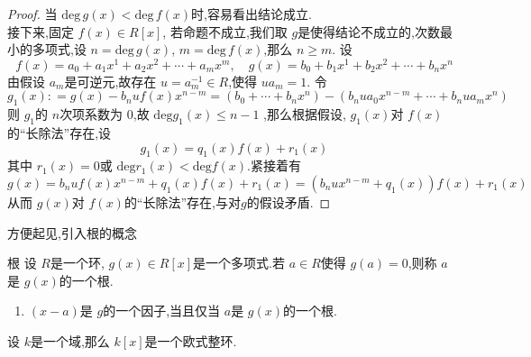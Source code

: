 \documentclass[lang=cn,12pt,color=green,fontset=none,pad]{elegantbook}
\begin{document}
\begin{proof}
    当 $ \mathrm{deg}\,g\left( x \right)< \mathrm{deg}\,f\left( x \right)   $时,容易看出结论成立.\\ 
   接下来,固定 $ f\left( x \right) \in  R[x]  $, 若命题不成立,我们取 $ g $是使得结论不成立的,次数最小的多项式,设 $   n  =  \mathrm{deg}\,g\left( x \right) $, $ m = \mathrm{deg}\,f\left( x \right)  $,那么 $ n \ge m $.
   设 $$
   f\left( x \right) = a_0+a_1x^1+a_2x^2+\cdots+a_mx^m,\quad g\left( x \right)= b_0+b_1x^1+b_2x^2+\cdots+b_nx^n  
   $$由假设 $ a_{m} $是可逆元,故存在 $ u= a_{m}^{-1}  \in  R $,使得 $ u a_{m}= 1 $. 令 $$
   g_{1}\left( x \right): = g\left( x \right) - b_{n}uf\left( x \right) x^{n-m}= \left( b_0+ \cdots + b_{n}x^{n} \right)    -\left( b_{n}ua_{0}x^{n-m}+ \cdots +  b_{n}u a_{m}x^{n} \right)   
   $$     则 $ g_1 $的 $ n $次项系数为 $ 0 $,故 $ \mathrm{deg}g_1\left( x \right) \le n-1 $     ,那么根据假设, $ g_1 \left( x \right) $对 $ f\left( x \right)  $的“长除法”存在,设 $$
   g_1\left( x \right) = q_1\left( x \right) f\left( x \right) + r_1\left( x \right) 
   $$其中 $ r_1\left( x \right)=0  $或 $ \mathrm{deg}r_1\left( x \right) < \mathrm{deg} f\left( x \right)  $.紧接着有 $$
   g\left( x \right)= b_{n}uf\left( x \right)   x^{n-m} +  q_1\left( x \right) f\left( x \right) + r_1\left( x \right)= \left( b_{n}u x^{n-m}+ q_1\left( x \right)  \right)f\left( x \right)+  r_1\left( x \right)     
   $$    从而 $ g\left( x \right)  $对 $ f\left( x \right)  $的“长除法”存在,与对$ g $的假设矛盾.   
\end{proof}

方便起见,引入根的概念 
\begin{definition}{根}
    设 $ R $是一个环, $ g\left( x \right) \in R[x]  $是一个多项式.若 $ a \in R $使得 $ g\left( a \right)=0  $,则称 $ a $ 是 $ g\left( x \right)  $的一个根.     
    
\end{definition}

\begin{remark}
    \begin{enumerate}
        \item $ \left( x-a \right)  $是 $ g $的一个因子,当且仅当 $ a $是 $ g\left( x \right)  $的一个根.    
    \end{enumerate}
    
\end{remark}

\begin{theorem}
    设 $ k $是一个域,那么 $ k\left[ x \right]  $是一个欧式整环.  
\end{theorem}
\end{document}
